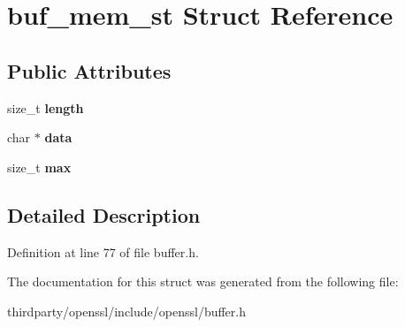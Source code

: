 \hypertarget{structbuf__mem__st}{}\section{buf\+\_\+mem\+\_\+st Struct Reference}
\label{structbuf__mem__st}
\subsection*{Public Attributes}
\begin{DoxyCompactItemize}
\item 
\mbox{\label{structbuf__mem__st_aa2bd5895b125d1b8f3ec5db5914abf21}} 
size\+\_\+t {\bfseries length}
\item 
\mbox{\label{structbuf__mem__st_aff3f0a4329a4dccdc9d08eaf4223e95c}} 
char $\ast$ {\bfseries data}
\item 
\mbox{\label{structbuf__mem__st_a300f344aae77102e18dde58449b18ed3}} 
size\+\_\+t {\bfseries max}
\end{DoxyCompactItemize}


\subsection{Detailed Description}


Definition at line 77 of file buffer.\+h.



The documentation for this struct was generated from the following file\+:\begin{DoxyCompactItemize}
\item 
thirdparty/openssl/include/openssl/buffer.\+h\end{DoxyCompactItemize}

